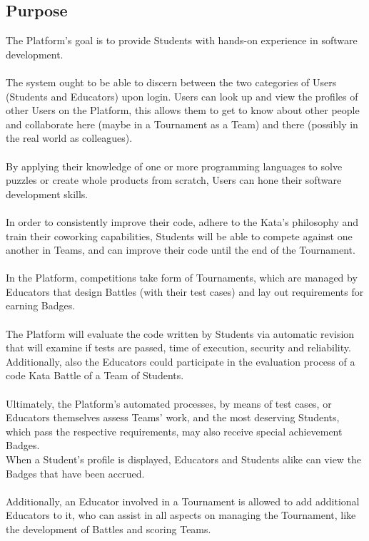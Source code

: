 \subsection{Purpose}
The Platform's goal is to provide Students with hands-on experience in software development.
\\
\\
The system ought to be able to discern between the two categories of Users (Students and Educators) upon login.
Users can look up and view the profiles of other Users on the Platform, this allows them to get to know about other people and collaborate here (maybe in a Tournament as a Team) and there (possibly in the real world as colleagues).
\\ \\
By applying their knowledge of one or more programming languages to solve puzzles or create whole products from scratch, Users can hone their software development skills. 
\\ \\
In order to consistently improve their code, adhere to the Kata's philosophy and train their coworking capabilities, Students will be able to compete against one another in Teams, and can improve their code until the end of the Tournament.
\\ \\
In the Platform, competitions take form of Tournaments, which are managed by Educators that design Battles (with their test cases) and lay out requirements for earning Badges.
\\ \\
The Platform will evaluate the code written by Students via automatic revision that will examine if tests are passed, time of execution, security and reliability. Additionally, also the Educators could participate in the evaluation process of a code Kata Battle of a Team of Students.
\\ \\
Ultimately, the Platform's automated processes, by means of test cases, or Educators themselves assess Teams' work, and the most deserving Students, which pass the respective requirements, may also receive special achievement Badges.\\ When a Student's profile is displayed, Educators and Students alike can view the Badges that have been accrued.
\\ \\
Additionally, an Educator involved in a Tournament is allowed to add additional Educators to it, who can assist in all aspects on managing the Tournament, like the development of Battles and scoring Teams.

